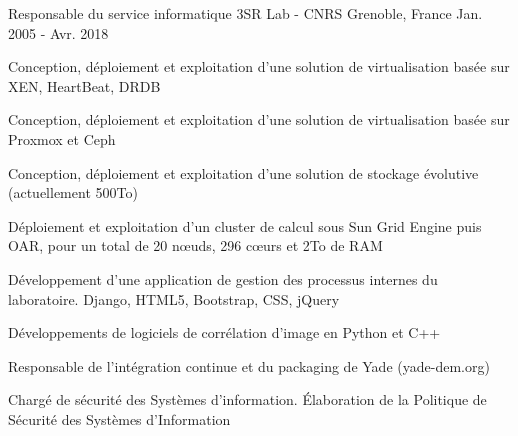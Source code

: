 \begin{cventries}
  \cventry
    {Responsable du service informatique} %
    {3SR Lab - CNRS} %
    {Grenoble, France} %
    {Jan. 2005 - Avr. 2018} %
    {
      \begin{cvitems} %
        \item {Conception, déploiement et exploitation d'une solution de virtualisation basée sur XEN, HeartBeat, DRDB}
        \item {Conception, déploiement et exploitation d'une solution de virtualisation basée sur Proxmox et Ceph}
        \item {Conception, déploiement et exploitation d'une solution de stockage évolutive (actuellement 500To)}
        \item {Déploiement et exploitation d'un cluster de calcul sous Sun Grid Engine puis OAR, pour un total de 20 nœuds, 296 cœurs et 2To de RAM}
        \item {Développement d'une application de gestion des processus internes du laboratoire. Django, HTML5, Bootstrap, CSS, jQuery}
        \item {Développements de logiciels de corrélation d'image en Python et C++}
        \item {Responsable de l'intégration continue et du packaging de Yade (yade-dem.org)}
        \item {Chargé de sécurité des Systèmes d'information. Élaboration de la Politique de Sécurité des Systèmes d'Information}
      \end{cvitems}
    }

\end{cventries}

